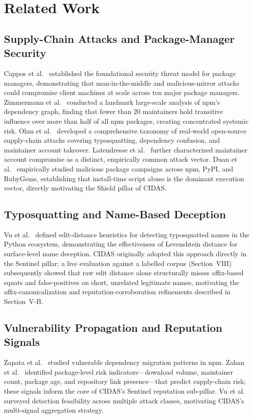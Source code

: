 \documentclass[journal]{IEEEtran}
\begin{document}
\section{Related Work}

\subsection{Supply-Chain Attacks and Package-Manager Security}
Cappos et al.~\cite{cappos2008} established the foundational security threat model for package managers,
demonstrating that man-in-the-middle and malicious-mirror attacks could compromise client machines at scale
across ten major package managers. Zimmermann et al.~\cite{zimmermann2019} conducted a landmark large-scale
analysis of npm's dependency graph, finding that fewer than 20 maintainers hold transitive influence over
more than half of all npm packages, creating concentrated systemic risk. Ohm et al.~\cite{ohm2020} developed
a comprehensive taxonomy of real-world open-source supply-chain attacks covering typosquatting, dependency
confusion, and maintainer account takeover. Latendresse et al.~\cite{latendresse2022} further characterized
maintainer account compromise as a distinct, empirically common attack vector. Duan et al.~\cite{duan2021}
empirically studied malicious package campaigns across npm, PyPI, and RubyGems, establishing that
install-time script abuse is the dominant execution vector, directly motivating the Shield pillar of CIDAS.

\subsection{Typosquatting and Name-Based Deception}
Vu et al.~\cite{vu2020} defined edit-distance heuristics for detecting typosquatted names in the Python
ecosystem, demonstrating the effectiveness of Levenshtein distance for surface-level name deception. CIDAS
originally adopted this approach directly in the Sentinel pillar; a live evaluation against a labelled corpus
(Section~VIII) subsequently showed that raw edit distance alone structurally misses affix-based squats and
false-positives on short, unrelated legitimate names, motivating the affix-canonicalization and
reputation-corroboration refinements described in Section~V-B.

\subsection{Vulnerability Propagation and Reputation Signals}
Zapata et al.~\cite{zapata2018} studied vulnerable dependency migration patterns in npm. Zahan et
al.~\cite{zahan2022} identified package-level risk indicators---download volume, maintainer count, package
age, and repository link presence---that predict supply-chain risk; these signals inform the core of CIDAS's
Sentinel reputation sub-pillar. Vu et al.~\cite{vu2021} surveyed detection feasibility across multiple attack
classes, motivating CIDAS's multi-signal aggregation strategy.
\end{document}
